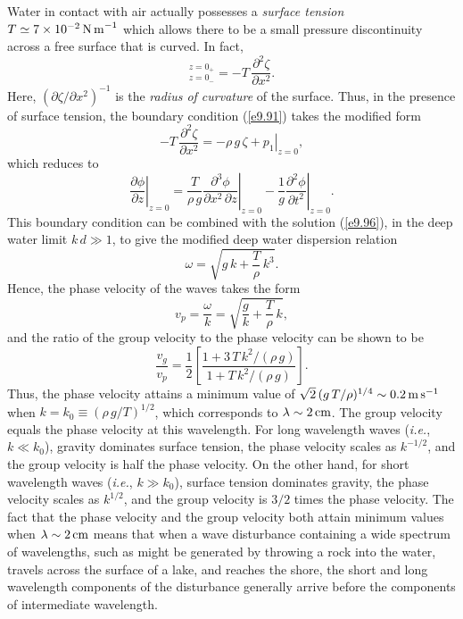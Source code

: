 Water in contact with air actually possesses a {\em surface tension}\/ $T\simeq 7\times 10^{-2}\,{\rm N\,m}^{-1}$ which allows there to be a small pressure discontinuity
across a free surface that is curved. In fact,
\begin{equation}
[p]_{z=0_-}^{z=0_+} = - T\,\frac{\partial^2 \zeta}{\partial x^2}.
\end{equation}
Here, $(\partial\zeta/\partial x^2)^{-1}$ is the {\em radius of curvature}\/ of the surface.
Thus, in the presence of surface tension, the boundary condition (\ref{e9.91})
takes the modified form
\begin{equation}
-T\,\frac{\partial^2\zeta}{\partial x^2} = -\rho\,g\,\zeta+ \left. p_1\right|_{z=0},
\end{equation}
which reduces to
\begin{equation}
\left.\frac{\partial \phi}{\partial z}\right|_{z=0} = \frac{T}{\rho\,g}\left.\frac{\partial^3\phi}{\partial x^2\,\partial z}\right|_{z=0} -\frac{1}{g}\left.\frac{\partial^2\phi}{\partial t^2}\right|_{z=0}.
\end{equation}
This boundary condition can be combined with the solution (\ref{e9.96}), in the
deep water limit $k\,d\gg 1$, to give the modified deep water dispersion
relation
\begin{equation}\label{e9.105}
\omega = \sqrt{g\,k + \frac{T}{\rho}\,k^3}.
\end{equation}
Hence, the phase velocity of the waves takes the form
\begin{equation}
v_p = \frac{\omega}{k} = \sqrt{\frac{g}{k} + \frac{T}{\rho}\,k},
\end{equation}
and the ratio of the group velocity to the phase velocity can be shown to
be
\begin{equation}
\frac{v_g}{v_p} = \frac{1}{2}\left[\frac{1+3\,T\,k^2/(\rho\,g)}{1+T\,k^2/(\rho\,g)}\right].
\end{equation}
Thus, the phase velocity attains a minimum value of $\sqrt{2}\,(g\,T/\rho)^{1/4}\sim 0.2\,{\rm m\,s}^{-1}$
when $k=k_0\equiv (\rho\,g/T)^{1/2}$, which corresponds to $\lambda\sim 2\,{\rm cm}$. The group velocity equals the phase velocity at this wavelength. For long wavelength waves ({\em i.e.}, 
$k\ll k_0$), gravity dominates surface tension, the phase velocity scales as $k^{-1/2}$,
and the group velocity is half the phase velocity. On the other hand, for
short wavelength waves ({\em i.e.}, $k\gg k_0$), surface tension dominates gravity, the
phase velocity scales as $k^{1/2}$, and the group velocity is $3/2$ times the
phase velocity. The fact that the phase velocity and the group velocity both
attain minimum values when  $\lambda\sim 2\,{\rm cm}$ means that when a
wave disturbance containing a wide spectrum of wavelengths, such as might be
generated by throwing a rock into the water, travels
across the surface of a lake, and reaches the shore, the short and long wavelength components of the disturbance generally arrive before the components of intermediate wavelength.


